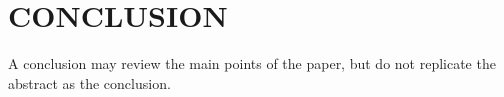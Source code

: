 \documentclass[12pt]{witseiepaper}
\begin{document}









%
\section{CONCLUSION}

A conclusion may review the main points of the paper, but do not replicate the
abstract as the conclusion.


%

\newpage
\newcommand{\summary}[1]{\addtocontents{toc}{#1\par}}
{}
\end{document}
